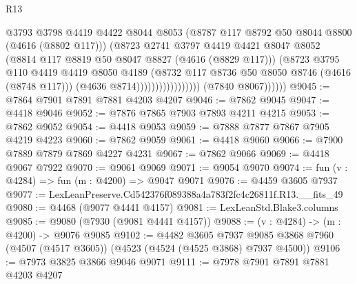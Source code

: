 \begin{lexlean}{R13}
\begin{coremodule}
                                          @3793
                                          @3798
                                          @4419
                                          @4422
                                          @8044
                                          @8053
                                          (@8787 @117 @8792 @50 @8044 @8800 (@4616 (@8802 @117)))
                                          (@8723
                                            @2741
                                            @3797
                                            @4419
                                            @4421
                                            @8047
                                            @8052
                                            (@8814 @117 @8819 @50 @8047 @8827 (@4616 (@8829 @117)))
                                            (@8723
                                              @3795
                                              @110
                                              @4419
                                              @4419
                                              @8050
                                              @4189
                                              (@8732
                                                @117
                                                @8736
                                                @50
                                                @8050
                                                @8746
                                                (@4616 (@8748 @117)))
                                              (@4636 @8714)))))))))))))))))
              (@7840 @8067))))))
@9045 := @7864 @7901 @7891 @7881 @4203 @4207
@9046 := @7862 @9045
@9047 := @4418 @9046
@9052 := @7876 @7865 @7903 @7893 @4211 @4215
@9053 := @7862 @9052
@9054 := @4418 @9053
@9059 := @7888 @7877 @7867 @7905 @4219 @4223
@9060 := @7862 @9059
@9061 := @4418 @9060
@9066 := @7900 @7889 @7879 @7869 @4227 @4231
@9067 := @7862 @9066
@9069 := @4418 @9067 @7922
@9070 := @9061 @9069
@9071 := @9054 @9070
@9074 := fun (v : @4284) => fun (m : @4200) => @9047 @9071
@9076 := @4459 @3605 @7937
@9077 := LexLeanPreserve.Cd542376f089388a4a783f2fc4c26811f.R13.__fits_49
@9080 := @4468 (@9077 @4441 @4157)
@9081 := LexLeanStd.Blake3.columns
@9085 := @9080 (@7930 (@9081 @4441 @4157))
@9088 := (v : @4284) -> (m : @4200) -> @9076 @9085
@9102 := @4482
    @3605
    @7937
    @9085
    @3868
    @7960
    (@4507 (@4517 @3605))
    (@4523 (@4524 (@4525 @3868) @7937 @4500))
@9106 := @7973 @3825 @3866 @9046 @9071
@9111 := @7978 @7901 @7891 @7881 @4203 @4207

\end{coremodule}
\end{lexlean}
